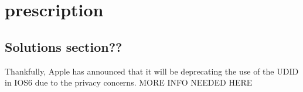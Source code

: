 \section{prescription}



\subsection{Solutions section??}

    Thankfully, Apple has announced that it will be deprecating the use of the UDID in IOS6 due to the privacy concerns. MORE INFO NEEDED HERE

